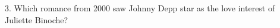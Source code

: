 \begin{frame}
\begin{center}
\Large
3. Which romance from 2000 saw Johnny Depp star as the love interest of Juliette Binoche?
\\
\\
\end{center}
\end{frame}
\begin{frame}

\end{frame}

